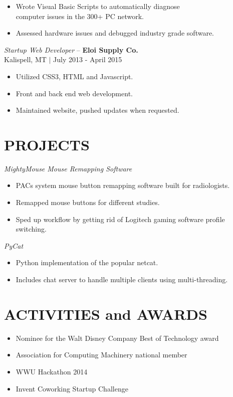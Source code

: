 \documentclass[line,margin]{res}
\begin{document}
\begin{resume}
\begin{itemize}
		\item Wrote Visual Basic Scripts to automatically diagnose \\computer issues in the 300+ PC network.
		\item Assessed hardware issues and debugged industry grade software.
	\end{itemize}
	{\sl Startup Web Developer} -- {\bf Eloi Supply Co.} \\
	{\footnotesize Kalispell, MT $|$  July 2013 - April 2015}\\
	\begin{itemize} \itemsep -2pt
		\item Utilized CSS3, HTML and Javascript.
		\item Front and back end web development.
		\item Maintained website, pushed updates when requested.
	\end{itemize}
	\section{PROJECTS}
		{\sl MightyMouse Mouse Remapping Software}
\begin{itemize}\itemsep -2pt
		\item PACs system mouse button remapping software built for radiologists.
		\item Remapped mouse buttons for different studies.
		\item Sped up workflow by getting rid of Logitech gaming software profile switching.
	\end{itemize}
	{\sl PyCat}
	\begin{itemize}\itemsep -2pt
		\item Python implementation of the popular netcat.
		\item Includes chat server to handle multiple clients using multi-threading.
	\end{itemize}



\section{ACTIVITIES and AWARDS}
	\begin{itemize} \itemsep -3pt
	\item Nominee for the Walt Disney Company Best of Technology award
	\item Association for Computing Machinery national member
	\item WWU Hackathon 2014
	\item Invent Coworking Startup Challenge
	\end{itemize}

\end{resume}
\end{document}
